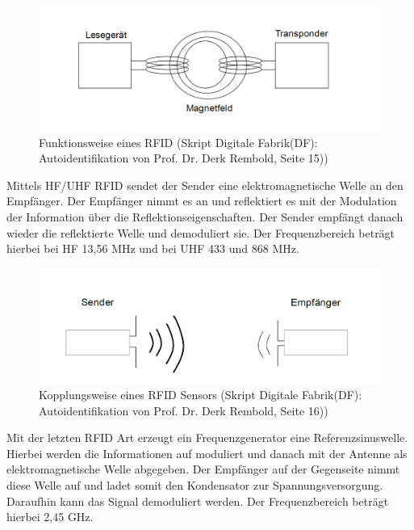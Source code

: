 \documentclass[a4paper,12pt]{scrartcl}
\begin{document}
\begin{figure}[H]
\centering
\includegraphics[scale=0.28]{picture/rfid}
\caption{Funktionsweise eines RFID (Skript Digitale Fabrik(DF): Autoidentifikation von Prof. Dr. Derk Rembold, Seite 15))}
\label{fig:Funktionsweise eines RFID}
\end{figure}

Mittels HF/UHF RFID sendet der Sender eine elektromagnetische Welle an den Empfänger. Der Empfänger nimmt es an und reflektiert es mit der Modulation der Information über die Reflektionseigenschaften. Der Sender empfängt danach wieder die reflektierte Welle und demoduliert sie. Der Frequenzbereich beträgt hierbei bei HF 13,56 MHz und bei UHF 433 und 868 MHz.

\begin{figure}[H]
\centering
\includegraphics[scale=0.28]{picture/kopplung}
\caption{Kopplungsweise eines RFID Sensors (Skript Digitale Fabrik(DF): Autoidentifikation von Prof. Dr. Derk Rembold, Seite 16))}
\label{fig:Kopplungsweise eines RFID Sensors}
\end{figure}

Mit der letzten RFID Art erzeugt ein Frequenzgenerator eine Referenzsinuswelle. Hierbei werden die Informationen auf moduliert und danach mit der Antenne als elektromagnetische Welle abgegeben. Der Empfänger auf der Gegenseite nimmt diese Welle auf und ladet somit den Kondensator zur Spannungsversorgung. Daraufhin kann das Signal demoduliert werden. Der Frequenzbereich beträgt hierbei 2,45 GHz.
\end{document}
